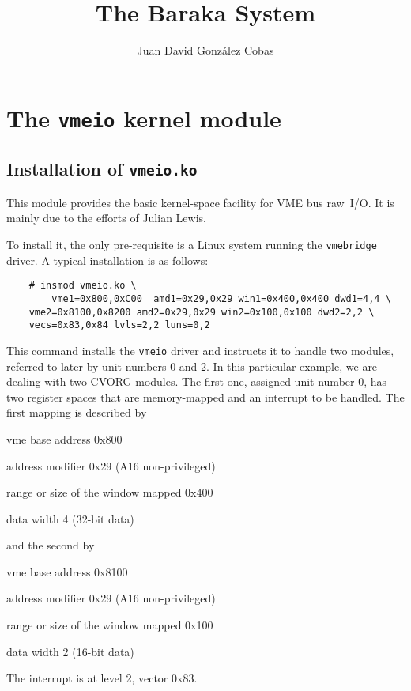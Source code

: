 \documentclass{article}
\title{The Baraka System}
\author{Juan David Gonz\'alez Cobas}
\begin{document}
\maketitle

\section{The \texttt{vmeio} kernel module}

\subsection{Installation of \texttt{vmeio.ko}}

This module provides the basic kernel-space facility for VME bus
raw~I/O. It is mainly due to the efforts of Julian Lewis.

To install it, the only pre-requisite is a Linux system running the
\texttt{vmebridge} driver. A typical installation is as follows:
\begin{Verbatim}
    # insmod vmeio.ko \
        vme1=0x800,0xC00  amd1=0x29,0x29 win1=0x400,0x400 dwd1=4,4 \
	vme2=0x8100,0x8200 amd2=0x29,0x29 win2=0x100,0x100 dwd2=2,2 \
	vecs=0x83,0x84 lvls=2,2 luns=0,2
\end{Verbatim}
This command installs the \verb|vmeio| driver and instructs it to handle
two modules, referred to later by unit numbers 0 and 2. In this
particular example, we are dealing with two CVORG modules. The first
one, assigned unit number 0, has two register spaces that are
memory-mapped and an interrupt to be handled. The first mapping
is described by
\begin{compactdesc}
\item[vme base address] 0x800
\item[address modifier] 0x29 (A16 non-privileged)
\item[range or size of the window mapped] 0x400
\item[data width] 4 (32-bit data)
\end{compactdesc}
and the second by
\begin{compactdesc}
\item[vme base address] 0x8100
\item[address modifier] 0x29 (A16 non-privileged)
\item[range or size of the window mapped] 0x100
\item[data width] 2 (16-bit data)
\end{compactdesc}
The interrupt is at level 2, vector 0x83.
\end{document}
